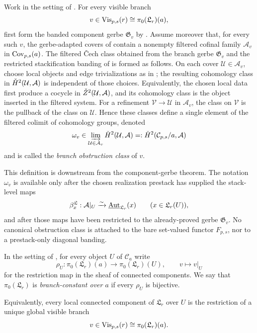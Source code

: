 \begin{definition}\label{def:cech-gluing-obstruction}
Work in the setting of . For every
visible branch
\[
v\in \mathrm{Vis}_{p,s}(r)\cong \pi_0(\mathfrak L_r)(a),
\]
first form the banded component gerbe $\mathfrak G_v$ by
. Assume moreover that, for every such
$v$, the gerbe-adapted covers of
 contain a nonempty filtered cofinal
family $\mathcal A_v$ in $\mathrm{Cov}_{p,s}(a)$. The filtered \v{C}ech class obtained
from the branch gerbe
$\mathfrak G_v$ and the restricted stackification banding of
 is formed as follows. On each
cover $\mathcal U\in\mathcal A_v$, choose local objects and edge
trivializations as in
; the resulting cohomology class
in $\check{H}^2(\mathcal U,\mathcal{A})$ is independent of those choices. Equivalently,
the chosen local data first produce a cocycle in
$\check Z^2(\mathcal U,\mathcal{A})$, and its cohomology class is the object inserted
in the filtered system. For a refinement
$\mathcal V\to\mathcal U$ in $\mathcal A_v$, the class on $\mathcal V$ is the
pullback of the class on $\mathcal U$. Hence these classes define a single
element of the filtered colimit of cohomology groups, denoted
\[
\omega_v\in
\varinjlim_{\mathcal U\in\mathcal A_v}\check{H}^2(\mathcal U,\mathcal{A})
=:\check{H}^2(\mathcal C_{p,s}/a,\mathcal{A})
\]
and is called the \emph{branch obstruction class} of $v$.

This definition is downstream from the component-gerbe theorem. The notation
$\omega_v$ is available only after the chosen realization prestack has supplied
the stack-level maps
\[
\beta^{\mathfrak L}_x:\mathcal{A}|_U\xrightarrow{\sim}
\underline{\mathrm{Aut}}_{\mathfrak L_r}(x)
\qquad (x\in\mathfrak L_r(U)),
\]
and after those maps have been restricted to the already-proved gerbe
$\mathfrak G_v$. No canonical obstruction class is attached to the bare
set-valued functor $F_{p,s}$, nor to a prestack-only diagonal banding.
\end{definition}

\begin{definition}\label{def:branch-constancy}
In the setting of , for every object
$U$ of $\mathcal C_a$ write
\[
\rho_U:\pi_0(\mathfrak L_r)(a)\longrightarrow \pi_0(\mathfrak L_r)(U),
\qquad
v\longmapsto v|_U
\]
for the restriction map in the sheaf of connected components. We say that
$\pi_0(\mathfrak L_r)$ is \emph{branch-constant over $a$} if every $\rho_U$ is
bijective.

Equivalently, every local connected component of $\mathfrak L_r$ over $U$ is
the restriction of a unique global visible branch
\[
v\in \mathrm{Vis}_{p,s}(r)\cong \pi_0(\mathfrak L_r)(a).
\]
\end{definition}

